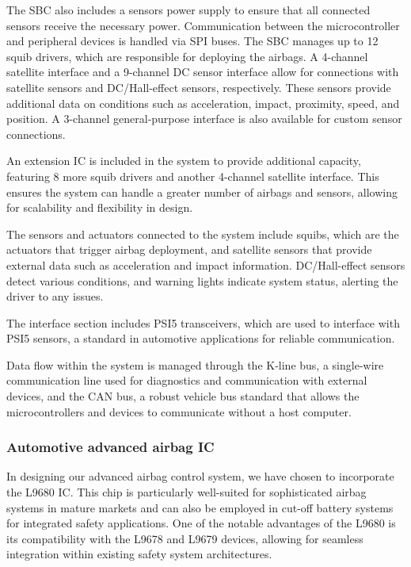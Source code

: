 \documentclass[12pt	]{article}
\begin{document}
The SBC also includes a sensors power supply to ensure that all connected sensors receive the necessary power. Communication between the microcontroller and peripheral devices is handled via SPI buses. The SBC manages up to 12 squib drivers, which are responsible for deploying the airbags. A 4-channel satellite interface and a 9-channel DC sensor interface allow for connections with satellite sensors and DC/Hall-effect sensors, respectively. These sensors provide additional data on conditions such as acceleration, impact, proximity, speed, and position. A 3-channel general-purpose interface is also available for custom sensor connections.

An extension IC is included in the system to provide additional capacity, featuring 8 more squib drivers and another 4-channel satellite interface. This ensures the system can handle a greater number of airbags and sensors, allowing for scalability and flexibility in design.

The sensors and actuators connected to the system include squibs, which are the actuators that trigger airbag deployment, and satellite sensors that provide external data such as acceleration and impact information. DC/Hall-effect sensors detect various conditions, and warning lights indicate system status, alerting the driver to any issues.

The interface section includes PSI5 transceivers, which are used to interface with PSI5 sensors, a standard in automotive applications for reliable communication.

Data flow within the system is managed through the K-line bus, a single-wire communication line used for diagnostics and communication with external devices, and the CAN bus, a robust vehicle bus standard that allows the microcontrollers and devices to communicate without a host computer.





\subsubsection{Automotive advanced airbag IC}
In designing our advanced airbag control system, we have chosen to incorporate the L9680 IC. This chip is particularly well-suited for sophisticated airbag systems in mature markets and can also be employed in cut-off battery systems for integrated safety applications. One of the notable advantages of the L9680 is its compatibility with the L9678 and L9679 devices, allowing for seamless integration within existing safety system architectures.
\end{document}
